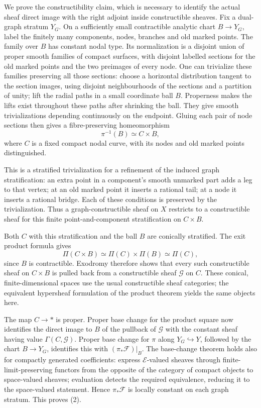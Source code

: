 \documentclass[11pt,a4paper]{article}
\theoremstyle{definition}\newtheorem{definition}[theorem]{Definition}
\theoremstyle{remark}\newtheorem{remark}[theorem]{Remark}
\begin{document}
We prove the constructibility claim, which is necessary to identify the
actual sheaf direct image with the right adjoint inside constructible
sheaves. Fix a dual-graph stratum \(Y_G\). On a sufficiently small
contractible analytic chart \(B\to Y_G\), label the finitely many
components, nodes, branches and old marked points. The family over \(B\)
has constant nodal type. Its normalization is a disjoint union of proper
smooth families of compact surfaces, with disjoint labelled sections for
the old marked points and the two preimages of every node. One can
trivialize these families preserving all those sections: choose a
horizontal distribution tangent to the section images, using disjoint
neighbourhoods of the sections and a partition of unity; lift the radial
paths in a small coordinate ball \(B\). Properness makes the lifts exist
throughout these paths after shrinking the ball. They give smooth
trivializations depending continuously on the endpoint. Gluing each pair
of node sections then gives a fibre-preserving homeomorphism \[
\pi^{-1}(B)\simeq C\times B,
\tag{CC-RES.3}
\] where \(C\) is a fixed compact nodal curve, with its nodes and old
marked points distinguished.

This is a stratified trivialization for a refinement of the induced
graph stratification: an extra point in a component's smooth unmarked
part adds a leg to that vertex; at an old marked point it inserts a
rational tail; at a node it inserts a rational bridge. Each of these
conditions is preserved by the trivialization. Thus a
graph-constructible sheaf on \(X\) restricts to a constructible sheaf
for this finite point-and-component stratification on \(C\times B\).

Both \(C\) with this stratification and the ball \(B\) are conically
stratified. The exit product formula gives \[
\Pi(C\times B)\simeq\Pi(C)\times\Pi(B)\simeq\Pi(C),
\] since \(B\) is contractible. Exodromy therefore shows that every such
constructible sheaf on \(C\times B\) is pulled back from a constructible
sheaf \(\mathcal G\) on \(C\). These conical, finite-dimensional spaces
use the usual constructible sheaf categories; the equivalent hypersheaf
formulation of the product theorem yields the same objects here.

The map \(C\to *\) is proper. Proper base change for the product square
now identifies the direct image to \(B\) of the pullback of
\(\mathcal G\) with the constant sheaf having value
\(\Gamma(C,\mathcal G)\). Proper base change for \(\pi\) along
\(Y_G\hookrightarrow Y\), followed by the chart \(B\to Y_G\), identifies
this with \((\pi_*\mathcal F)|_B\). The base-change theorem holds also
for compactly generated coefficients: express \(\mathcal E\)-valued
sheaves through finite-limit-preserving functors from the opposite of the category of compact objects to
space-valued sheaves; evaluation detects the required equivalence,
reducing it to the space-valued statement. Hence \(\pi_*\mathcal F\) is
locally constant on each graph stratum. This proves (2).
\end{document}
